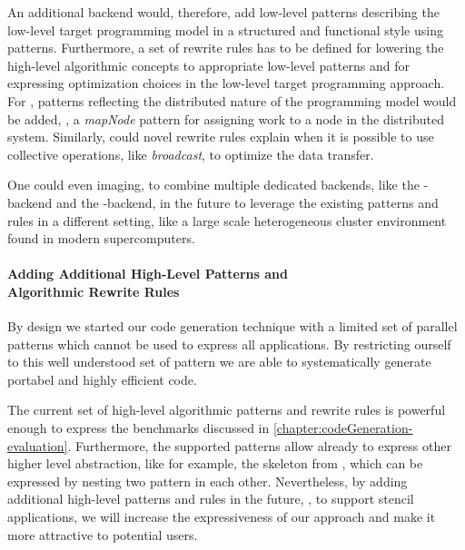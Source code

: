 An additional backend would, therefore, add low-level patterns describing the low-level target programming model in a structured and functional style using patterns.
Furthermore, a set of rewrite rules has to be defined for lowering the high-level algorithmic concepts to appropriate low-level patterns and for expressing optimization choices in the low-level target programming approach.
For \MPI, patterns reflecting the distributed nature of the programming model would be added, \eg, a \emph{mapNode} pattern for assigning work to a node in the distributed system.
Similarly, could novel rewrite rules explain when it is possible to use collective operations, like \emph{broadcast}, to optimize the data transfer.

One could even imaging, to combine multiple dedicated backends, like the \MPI-backend and the \OpenCL-backend, in the future to leverage the existing patterns and rules in a different setting, like a large scale heterogeneous cluster environment found in modern supercomputers.

\paragraph{Adding Additional High-Level Patterns and\\ Algorithmic Rewrite Rules}
By design we started our code generation technique with a limited set of parallel patterns which cannot be used to express all applications.
By restricting ourself to this well understood set of pattern we are able to systematically generate portabel and highly efficient code.

The current set of high-level algorithmic patterns and rewrite rules is powerful enough to express the benchmarks discussed in \autoref{chapter:codeGeneration-evaluation}.
Furthermore, the supported patterns allow already to express other higher level abstraction, like for example, the \allpairs skeleton from \SkelCL, which can be expressed by nesting two \map pattern in each other.
Nevertheless, by adding additional high-level patterns and rules in the future, \eg, to support stencil applications, we will increase the expressiveness of our approach and make it more attractive to potential users.

